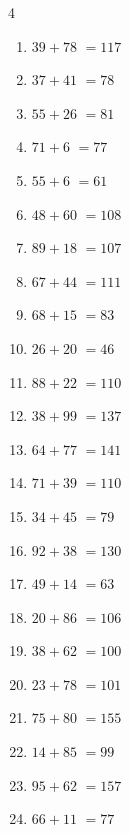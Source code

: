 \begin{multicols}{4}
\begin{enumerate}
  \item $39+78$
        $=117$

  \item $37+41$
        $=78$

  \item $55+26$
        $=81$

  \item $71+6$
        $=77$

  \item $55+6$
        $=61$

  \item $48+60$
        $=108$

  \item $89+18$
        $=107$

  \item $67+44$
        $=111$

  \item $68+15$
        $=83$

  \item $26+20$
        $=46$

  \item $88+22$
        $=110$

  \item $38+99$
        $=137$

  \item $64+77$
        $=141$

  \item $71+39$
        $=110$

  \item $34+45$
        $=79$

  \item $92+38$
        $=130$

  \item $49+14$
        $=63$

  \item $20+86$
        $=106$

  \item $38+62$
        $=100$

  \item $23+78$
        $=101$

  \item $75+80$
        $=155$

  \item $14+85$
        $=99$

  \item $95+62$
        $=157$

  \item $66+11$
        $=77$


\end{enumerate}
\end{multicols}
